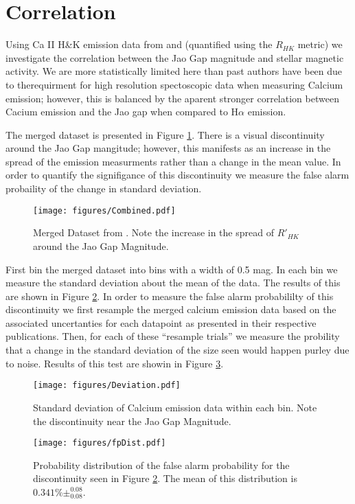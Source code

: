 \section{Correlation}\label{sec:results}
Using Ca II H\&K emission data from \citet{Boudreaux2021} and
\citet{Perdelwitz2021} (quantified using the $R_{HK}$ metric) we investigate
the correlation between the Jao Gap magnitude and stellar magnetic activity. We
are more statistically limited here than past authors have been due to
therequirment for high resolution spectoscopic data when measuring Calcium
emission; however, this is balanced by the aparent stronger correlation between
Cacium emission and the Jao gap when compared to H$\alpha$ emission. 

The merged dataset is presented in Figure \ref{fig:mergedData}. There is a
visual discontinuity around the Jao Gap mangitude; however, this manifests as
an increase in the spread of the emission measurments rather than a change in
the mean value. In order to quantify the signifigance of this discontinuity we
measure the false alarm probaility of the change in standard deviation.

\begin{figure}
  \centering
  \texttt{[image: figures/Combined.pdf]}
  \caption{Merged Dataset from \citet{Boudreaux2021, Perdelwitz2021}. Note the
  increase in the spread of $R'_{HK}$ around the Jao Gap Magnitude.}
  \label{fig:mergedData}
\end{figure}

First bin the merged dataset into bins with a width of 0.5 mag. In each bin we
measure the standard deviation about the mean of the data. The results of this
are shown in Figure \ref{fig:deviation}. In order to measure the false alarm
probabililty of this discontinuity we first resample the merged calcium
emission data based on the associated uncertanties for each datapoint as
presented in their respective publications. Then, for each of these ``resample
trials'' we measure the probility that a change in the standard deviation of
the size seen would happen purley due to noise. Results of this test are showin in Figure \ref{fig:dist}. 

\begin{figure}
  \centering
  \texttt{[image: figures/Deviation.pdf]}
  \caption{Standard deviation of Calcium emission data within each bin. Note the discontinuity near the Jao Gap Magnitude.}
  \label{fig:deviation}
\end{figure}

\begin{figure}
  \centering
  \texttt{[image: figures/fpDist.pdf]}
  \caption{Probability distribution of the false alarm probability for the discontinuity seen in Figure \ref{fig:deviation}. The mean of this distribution is $0.341\%\pm^{0.08}_{0.08}$.}
  \label{fig:dist}
\end{figure}
